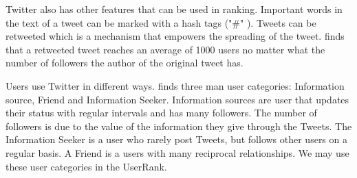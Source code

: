 

Twitter also has other features that can be used in ranking. Important words in the text of a tweet can be marked with a hash tags ("\#" ). Tweets can be retweeted which is a mechanism that empowers the spreading of the tweet. \citep{Kwak2010} finds that a retweeted tweet reaches an average of 1000 users no matter what the number of followers the author of the original tweet has. 


Users use Twitter in different ways. \citet{Akshay2007} finds three man user categories: Information source, Friend and Information Seeker. Information sources are user that updates their status with regular intervals and has many followers. The number of followers is due to the value of the information they give through the Tweets. The Information Seeker is a user who rarely post Tweets, but follows other users on a regular basis. A Friend is a users with many reciprocal relationships. We may use these user categories in the UserRank. 




